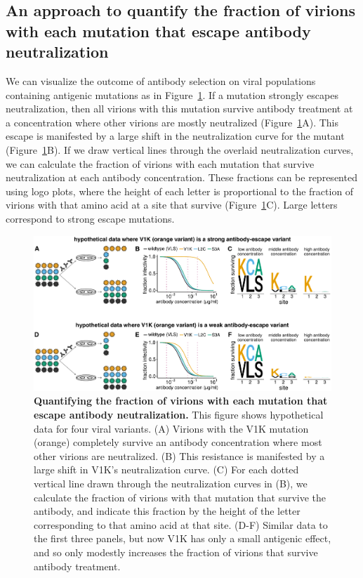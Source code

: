\documentclass[11pt]{article}
\begin{document}
\subsection*{An approach to quantify the fraction of virions with each mutation that escape antibody neutralization}
We can visualize the outcome of antibody selection on viral populations containing antigenic mutations as in Figure~\ref{fig:fracsurvive_example}.
If a mutation strongly escapes neutralization, then all virions with this mutation survive antibody treatment at a concentration where other virions are mostly neutralized (Figure~\ref{fig:fracsurvive_example}A).
This escape is manifested by a large shift in the neutralization curve for the mutant (Figure~\ref{fig:fracsurvive_example}B).
If we draw vertical lines through the overlaid neutralization curves, we can calculate the fraction of virions with each mutation that survive neutralization at each antibody concentration.
These fractions can be represented using logo plots, where the height of each letter is proportional to the fraction of virions with that amino acid at a site that survive (Figure~\ref{fig:fracsurvive_example}C).
Large letters correspond to strong escape mutations. 

\begin{figure}
\centerline{\includegraphics[width=\textwidth]{figs/fracsurvive_example/fracsurvive_fig.pdf}}
\caption{\label{fig:fracsurvive_example}
{\bf Quantifying the fraction of virions with each mutation that escape antibody neutralization.}
This figure shows hypothetical data for four viral variants.
(A) Virions with the V1K mutation (orange) completely survive an antibody concentration where most other virions are neutralized.
(B) This resistance is manifested by a large shift in V1K's neutralization curve.
(C) For each dotted vertical line drawn through the neutralization curves in (B), we calculate the fraction of virions with that mutation that survive the antibody, and indicate this fraction by the height of the letter corresponding to that amino acid at that site.
(D-F) Similar data to the first three panels, but now V1K has only a small antigenic effect, and so only modestly increases the fraction of virions that survive antibody treatment.
}
\end{figure}
\end{document}
